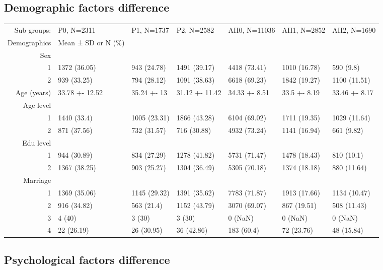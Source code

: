 \documentclass[11pt]{article}
\begin{document}
\subsection{Demographic factors difference}
\label{sec-4-1}
\begin{center}
\begin{tabular}{rllllll}
Sub-groups: & P0, N=2311 & P1, N=1737 & P2, N=2582 & AH0, N=11036 & AH1, N=2852 & AH2, N=1690\\
Demographics & Mean ± SD or N (\%) &  &  &  &  & \\
\hline
Sex &  &  &  &  &  & \\
1 & 1372 (36.05) & 943 (24.78) & 1491 (39.17) & 4418 (73.41) & 1010 (16.78) & 590 (9.8)\\
2 & 939 (33.25) & 794 (28.12) & 1091 (38.63) & 6618 (69.23) & 1842 (19.27) & 1100 (11.51)\\
Age (years) & 33.78 +- 12.52 & 35.24 +- 13 & 31.12 +- 11.42 & 34.33 +- 8.51 & 33.5 +- 8.19 & 33.46 +- 8.17\\
Age level &  &  &  &  &  & \\
1 & 1440 (33.4) & 1005 (23.31) & 1866 (43.28) & 6104 (69.02) & 1711 (19.35) & 1029 (11.64)\\
2 & 871 (37.56) & 732 (31.57) & 716 (30.88) & 4932 (73.24) & 1141 (16.94) & 661 (9.82)\\
Edu level &  &  &  &  &  & \\
1 & 944 (30.89) & 834 (27.29) & 1278 (41.82) & 5731 (71.47) & 1478 (18.43) & 810 (10.1)\\
2 & 1367 (38.25) & 903 (25.27) & 1304 (36.49) & 5305 (70.18) & 1374 (18.18) & 880 (11.64)\\
Marriage &  &  &  &  &  & \\
1 & 1369 (35.06) & 1145 (29.32) & 1391 (35.62) & 7783 (71.87) & 1913 (17.66) & 1134 (10.47)\\
2 & 916 (34.82) & 563 (21.4) & 1152 (43.79) & 3070 (69.07) & 867 (19.51) & 508 (11.43)\\
3 & 4 (40) & 3 (30) & 3 (30) & 0 (NaN) & 0 (NaN) & 0 (NaN)\\
4 & 22 (26.19) & 26 (30.95) & 36 (42.86) & 183 (60.4) & 72 (23.76) & 48 (15.84)\\
\end{tabular}
\end{center}
\subsection{Psychological factors difference}
\label{sec-4-2}
\end{document}
